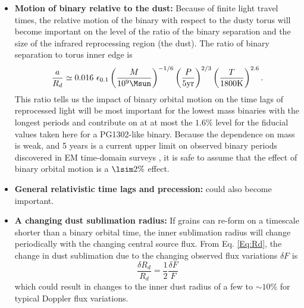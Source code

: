 \begin{itemize}
\item \textbf{Motion of binary relative to the dust:} Because of finite light travel times, the relative motion of the binary with respect to the dusty torus will become important on the level of the ratio of the binary separation and the size of the infrared reprocessing region (the dust). The ratio of binary separation to torus inner edge is
\begin{equation}
\frac{a}{R_d} \simeq 0.016\ \epsilon_{0.1} \left(\frac{M}{10^9 \Msun}\right)^{-1/6}  \left(\frac{P}{5 \rm{yr}}\right)^{2/3}  \left(\frac{T}{1800 \rm{K}}\right)^{2.6}.
\label{Eq:aORd}
\end{equation}
This ratio tells us the impact of binary orbital motion on the time lags of reprocessed light will be most important for the lowest mass binaries with the longest periods and contribute on at at most the $1.6 \%$ level for the fiducial values taken here for a PG1302-like binary. Because the dependence on mass is weak, and 5 years is a current upper limit on observed binary periods discovered in EM time-domain surveys \citep[\textit{e.g.}][]{Graham+2015b}, it is safe to assume that the effect of binary orbital motion is a $\lsim 2\%$ effect.%
 \item \textbf{General relativistic time lags and precession:} could also become important. %
 \item \textbf{A changing dust sublimation radius:} If grains can re-form on a timescale shorter than a binary orbital time, the inner sublimation radius will change periodically with the changing central source flux. From Eq. \ref{Eq:Rd}, the change in dust sublimation due to the changing observed flux variations $\delta F$ is
 \begin{equation}
 \frac{\delta R_d}{R_d} = \frac{1}{2} \frac{\delta F}{F}
 \end{equation}
which could result in changes to the inner dust radius of a few to $\sim 10 \%$ for typical Doppler flux variations.
\end{itemize}


